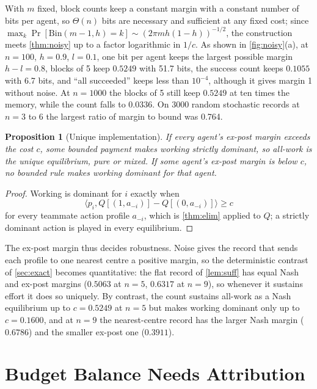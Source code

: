 \documentclass[sigconf,anonymous,acmthm=false]{acmart}
\theoremstyle{acmplain}
\newtheorem{proposition}{Proposition}
\theoremstyle{acmdefinition}
\begin{document}
With $m$ fixed, block counts keep a constant margin with a constant number of bits per agent,
so $\Theta(n)$ bits are necessary and sufficient at any fixed cost; since
$\max_k\Pr[\mathrm{Bin}(m-1,h)=k]\sim(2\pi mh(1-h))^{-1/2}$, the construction meets
\cref{thm:noisy} up to a factor logarithmic in $1/c$. As shown in \cref{fig:noisy}(a), at
$n=100$, $h=0.9$, $l=0.1$, one bit per agent keeps the largest possible margin $h-l=0.8$,
blocks of 5 keep $0.5249$ with 51.7 bits, the success count keeps $0.1055$ with 6.7 bits, and
``all succeeded'' keeps less than $10^{-4}$, although it gives margin 1 without noise. At
$n=1000$ the blocks of 5 still keep $0.5249$ at ten times the memory, while the count falls to
$0.0336$. On 3000 random stochastic records at $n=3$ to 6 the largest ratio of margin to
bound was 0.764.

\begin{proposition}[Unique implementation]\label{prop:unique}
If every agent's ex-post margin exceeds the cost $c$, some bounded payment makes working
strictly dominant, so all-work is the unique equilibrium, pure or mixed. If some agent's
ex-post margin is below $c$, no bounded rule makes working dominant for that agent.
\end{proposition}
\begin{proof}
Working is dominant for $i$ exactly when
\[ \langle p_i,Q[(1,a_{-i})]-Q[(0,a_{-i})]\rangle\ge c \]
for every teammate action profile $a_{-i}$, which is \cref{thm:elim} applied to $Q$; a strictly dominant action is played in
every equilibrium.
\end{proof}

The ex-post margin thus decides robustness. Noise gives the record that sends each profile to
one nearest centre a positive margin, so the deterministic contrast of \cref{sec:exact}
becomes quantitative: the flat record of \cref{lem:suff} has equal Nash and ex-post margins
($0.5063$ at $n=5$, $0.6317$ at $n=9$), so whenever it sustains effort it does so uniquely.
By contrast, the count sustains all-work as a Nash equilibrium up to $c=0.5249$ at $n=5$ but
makes working dominant only up to $c=0.1600$, and at $n=9$ the nearest-centre record has
the larger Nash margin ($0.6786$) and the smaller ex-post one ($0.3911$).

\section{Budget Balance Needs Attribution}\label{sec:bb}
\end{document}
